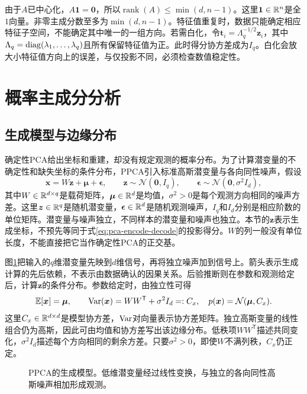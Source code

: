 由于$A$已中心化，$A\bm1=\bm0$，所以$\operatorname{rank}(A)\le\min(d,n-1)$。这里$\bm1\in\mathbb{R}^n$是全$1$向量。非零主成分数至多为$\min(d,n-1)$。特征值重复时，数据只能确定相应特征子空间，不能确定其中唯一的一组方向。若需白化，令$\bm t_i=\Lambda_q^{-1/2}\bm z_i$，其中$\Lambda_q=\operatorname{diag}(\lambda_1,\ldots,\lambda_q)$且所有保留特征值为正。此时得分协方差成为$I_q$。白化会放大小特征值方向上的误差，与仅投影不同，必须检查数值稳定性。

\section{概率主成分分析}
\subsection{生成模型与边缘分布}
确定性PCA给出坐标和重建，却没有规定观测的概率分布。为了计算潜变量的不确定性和缺失坐标的条件分布，PPCA引入标准高斯潜变量与各向同性噪声，假设
\begin{equation}
 \bm x=W\bm z+\bm\mu+\bm\epsilon,\qquad
 \bm z\sim\mathcal N(\bm0,I_q),\qquad
 \bm\epsilon\sim\mathcal N(\bm0,\sigma^2I_d),
 \label{eq:ppca-generative-model}
\end{equation}
其中$W\in\mathbb{R}^{d\times q}$是载荷矩阵，$\bm\mu\in\mathbb{R}^d$是均值，$\sigma^2>0$是每个观测方向相同的噪声方差。这里$\bm z\in\mathbb{R}^q$是随机潜变量，$\bm\epsilon\in\mathbb{R}^d$是随机观测噪声，$I_q$和$I_d$分别是相应阶数的单位矩阵。潜变量与噪声独立，不同样本的潜变量和噪声也独立。本节的$\bm z$表示生成坐标，不预先等同于式\eqref{eq:pca-encode-decode}的投影得分。$W$的列一般没有单位长度，不能直接把它当作确定性PCA的正交基。

图\ref{fig:ppca-generation}把输入的$q$维潜变量先映到$d$维信号，再将独立噪声加到信号上。箭头表示生成计算的先后依赖，不表示由数据确认的因果关系。后验推断则在参数和观测给定后，计算$\bm z$的条件分布。参数给定时，由独立性可得
\begin{equation}
 \mathbb{E}[\bm x]=\bm\mu,\qquad
 \operatorname{Var}(\bm x)=WW^{\mathsf T}+\sigma^2I_d=:C_x,
 \quad p(\bm x)=\mathcal N(\bm\mu,C_x).
 \label{eq:ppca-marginal}
\end{equation}
这里$C_x\in\mathbb{R}^{d\times d}$是模型协方差，$\operatorname{Var}$对向量表示协方差矩阵。独立高斯变量的线性组合仍为高斯，因此可由均值和协方差写出该边缘分布。低秩项$WW^{\mathsf T}$描述共同变化，$\sigma^2I_d$描述每个方向相同的剩余方差。只要$\sigma^2>0$，即使$W$不满列秩，$C_x$仍正定。

\begin{figure}[htbp]
\centering
{}
\caption{PPCA的生成模型。低维潜变量经过线性变换，与独立的各向同性高斯噪声相加形成观测。}
\label{fig:ppca-generation}
\end{figure}

